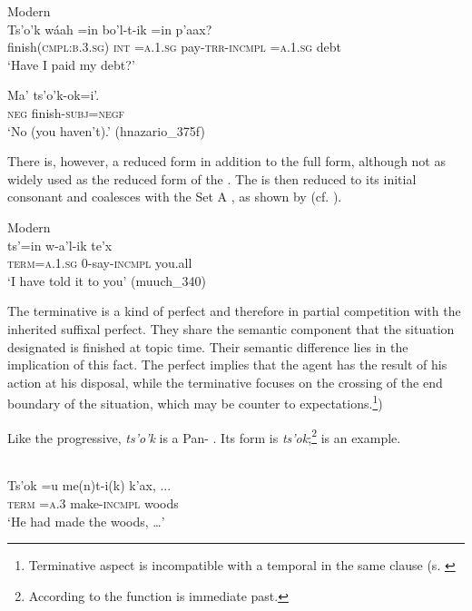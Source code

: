 \documentclass[output=paper]{langsci/langscibook}
\begin{document}
\ea\label{ex:lehmann:52}
Modern  \\
\ea
\gll   Ts'o'k            wáah  =in      bo'l-t-ik        =in        p'aax?\\
  finish(\textsc{cmpl:b.3.sg)}  \textsc{int}    =\textsc{a.1.sg}    pay-\textsc{trr-incmpl}   \textsc{=a.1.sg}    debt\\
\glt ‘Have I paid my debt?’

\ex
\gll  Ma'    ts'o'k-ok=i'.\\
\textsc{neg}    finish-\textsc{subj=negf}\\
\glt ‘No (you haven't).’ (hnazario\_375f)
\z
\z

There is, however, a reduced form in addition to the full form, although not as widely used as the reduced form of the . The  is then reduced to its initial consonant and coalesces with the Set A , as shown by  (cf. \citealt[87f]{BriceñoChel2000terminar}).\newpage

\ea\label{ex:lehmann:53}
Modern  \\
\gll       ts'=in        w-a'l-ik      te'x\\
 \textsc{term=a.1.sg}    \textsc{0}{}-say-\textsc{incmpl}  you.all\\
\glt ‘I have told it to you’ (muuch\_340)
\z

The terminative is a kind of perfect and therefore in partial competition with the inherited suffixal perfect. They share the semantic component that the situation designated is finished at topic time. Their semantic difference lies in the implication of this fact. The  perfect implies that the agent has the result of his action at his disposal, while the terminative focuses on the crossing of the end boundary of the situation, which may be counter to expectations.\footnote{Terminative aspect is incompatible with a temporal  in the same clause (s.  \citet[82f]{BriceñoChel2000terminar}})

Like the progressive, \textit{ts’o’k} is a Pan- . Its  form is \textit{ts’ok};\footnote{According to \citet[81, 93, 99]{Bruce1968} the function is immediate past.}  is an example.

\ea\label{ex:lehmann:54}
\\
\gll       Ts’ok  =u    me(n)t-i(k)    k’ax, ...\\
  \textsc{term } \textsc{=a.3}     make-\textsc{incmpl}  woods\\
\glt ‘He had made the woods, …’ \citep[24]{Bruce1974}
\z
\end{document}
